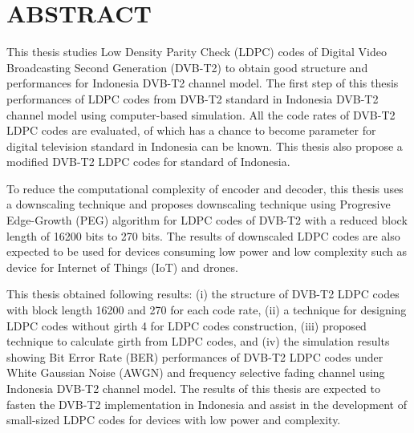 
\chapter*{ABSTRACT}
\vspace*{0.7cm}

This thesis studies Low Density Parity Check (LDPC) codes of Digital Video Broadcasting Second Generation (DVB-T2) to obtain good structure and performances for Indonesia DVB-T2 channel model. The first step of this thesis  performances of LDPC codes from DVB-T2 standard in Indonesia DVB-T2 channel model using computer-based simulation. All the code rates of DVB-T2 LDPC codes are evaluated, of which has a chance to become parameter for digital television standard in Indonesia can be known. This thesis also propose a modified DVB-T2 LDPC codes for standard of Indonesia.

 To reduce the computational complexity of encoder and decoder, this thesis uses a downscaling technique and proposes downscaling technique using Progresive Edge-Growth (PEG) algorithm for LDPC codes of DVB-T2 with a reduced block length of 16200 bits to 270 bits. The results of downscaled LDPC codes are also expected to be used for devices consuming low power and low complexity such as device for Internet of Things (IoT) and drones. 

This thesis obtained following results: (i) the structure of DVB-T2 LDPC codes with block length 16200 and 270 for each code rate, (ii) a technique for designing LDPC codes without girth 4 for LDPC codes construction, (iii) proposed technique to calculate girth from LDPC codes, and (iv) the simulation results showing  Bit Error Rate (BER) performances of DVB-T2 LDPC codes under  White Gaussian Noise (AWGN) and frequency selective fading channel using Indonesia DVB-T2 channel model. The results of this thesis are expected to fasten the DVB-T2 implementation in Indonesia and assist in the development of small-sized LDPC codes for devices with low power and complexity.


